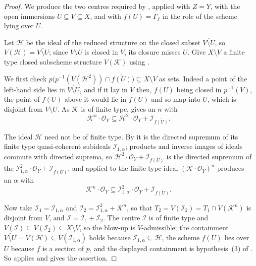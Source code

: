 \begin{proof}
  \leanok
  We produce the two centres required by
  , applied with $Z=Y$, with the
  open immersions $U\subseteq V\subseteq X$, and with $f(U)=\Gamma_f$ in the
  role of the scheme lying over $U$.

  Let $\mathcal H$ be the ideal of the reduced structure on the closed subset
  $\overline{V\setminus U}$, so $V(\mathcal H)=\overline{V\setminus U}$; since
  $V\setminus U$ is closed in $V$, its closure misses $U$.  Give $X\setminus V$
  a finite type closed subscheme structure $V(\mathcal K)$ using
  .

  We first check $p\bigl(p^{-1}(V(\mathcal H^2))\cap\overline{f(U)}\bigr)
  \subseteq X\setminus V$ as sets.  Indeed a point of the left-hand side lies
  in $\overline{V\setminus U}$, and if it lay in $V$ then, $f(U)$ being closed
  in $p^{-1}(V)$, the point of $\overline{f(U)}$ above it would lie in $f(U)$
  and so map into $U$, which is disjoint from $\overline{V\setminus U}$.  As
  $\mathcal K$ is of finite type,
   gives an $n$ with
  \[
    \mathcal K^n\cdot\mathcal O_Y\subseteq
      \mathcal H^2\cdot\mathcal O_Y+\mathcal I_{\overline{f(U)}} .
  \]

  The ideal $\mathcal H$ need not be of finite type.  By
   it is the directed
  supremum of its finite type quasi-coherent subideals $\mathcal I_{1,\alpha}$;
  products and inverse images of ideals commute with directed suprema, so
  $\mathcal H^2\cdot\mathcal O_Y+\mathcal I_{\overline{f(U)}}$ is the directed
  supremum of the $\mathcal I_{1,\alpha}^2\cdot\mathcal O_Y+
  \mathcal I_{\overline{f(U)}}$, and
   applied to the finite type
  ideal $(\mathcal K\cdot\mathcal O_Y)^n$ produces an $\alpha$ with
  \[
    \mathcal K^n\cdot\mathcal O_Y\subseteq
      \mathcal I_{1,\alpha}^2\cdot\mathcal O_Y+\mathcal I_{\overline{f(U)}} .
  \]

  Now take $\mathcal I_1=\mathcal I_{1,\alpha}$ and
  $\mathcal I_2=\mathcal I_{1,\alpha}^2+\mathcal K^n$, so that
  $T_2=V(\mathcal I_2)=T_1\cap V(\mathcal K^n)$ is disjoint from $V$, and
  $\mathcal I=\mathcal I_1+\mathcal I_2$.  The centre $\mathcal I$ is of finite
  type and $V(\mathcal I)\subseteq V(\mathcal I_2)\subseteq X\setminus V$, so
  the blow-up is $V$-admissible; the containment
  $\overline{V\setminus U}=V(\mathcal H)\subseteq V(\mathcal I_{1,\alpha})$
  holds because $\mathcal I_{1,\alpha}\subseteq\mathcal H$, the scheme $f(U)$
  lies over $U$ because $f$ is a section of $p$, and the displayed containment
  is hypothesis~(3) of .  So
   applies and gives the
  assertion.


\end{proof}
